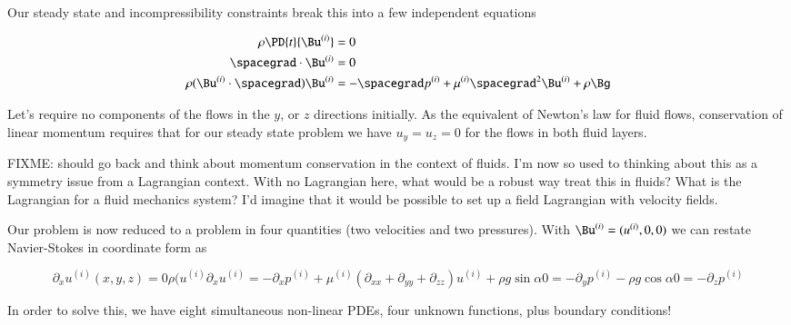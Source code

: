 Our steady state and incompressibility constraints break this into a few independent equations

\begin{align}\label{eqn:twoLayerInclinedFlow:30}
\rho \PD{t}{\Bu^{(i)}} &= 0 \\
\spacegrad \cdot \Bu^{(i)} &= 0 \\
\rho (\Bu^{(i)} \cdot \spacegrad) \Bu^{(i)} &= - \spacegrad p^{(i)} + \mu^{(i)} \spacegrad^2 \Bu^{(i)} + \rho \Bg
\end{align}

Let's require no components of the flows in the $y$, or $z$ directions initially.  As the equivalent of Newton's law for fluid flows, conservation of linear momentum requires that for our steady state problem we have $u_y = u_z = 0$ for the flows in both fluid layers.  

FIXME: should go back and think about momentum conservation in the context of fluids.  I'm now so used to thinking about this as a symmetry issue from a Lagrangian context.  With no Lagrangian here, what would be a robust way treat this in fluids?  What is the Lagrangian for a fluid mechanics system?  I'd imagine that it would be possible to set up a field Lagrangian with velocity fields.

Our problem is now reduced to a problem in four quantities (two velocities and two pressures).  With $\Bu^{(i)} = (u^{(i)}, 0, 0)$ we can restate Navier-Stokes in coordinate form as

\begin{subequations}
\label{eqn:twoLayerInclinedFlow:50}
\begin{equation}\label{eqn:twoLayerInclinedFlow:110}
\partial_x u^{(i)}(x,y,z) = 0
\end{equation}
\begin{equation}\label{eqn:twoLayerInclinedFlow:130}
\rho (u^{(i)} \partial_x u^{(i)} = - \partial_x p^{(i)} + \mu^{(i)} (\partial_{xx} + \partial_{yy} + \partial_{zz}) u^{(i)} + \rho g \sin\alpha 
\end{equation}
\begin{equation}\label{eqn:twoLayerInclinedFlow:150}
0 = - \partial_y p^{(i)} - \rho g \cos\alpha 
\end{equation}
\begin{equation}\label{eqn:twoLayerInclinedFlow:155}
0 = - \partial_z p^{(i)} 
\end{equation}
\end{subequations}

In order to solve this, we have eight simultaneous non-linear PDEs, four unknown functions, plus boundary conditions!

